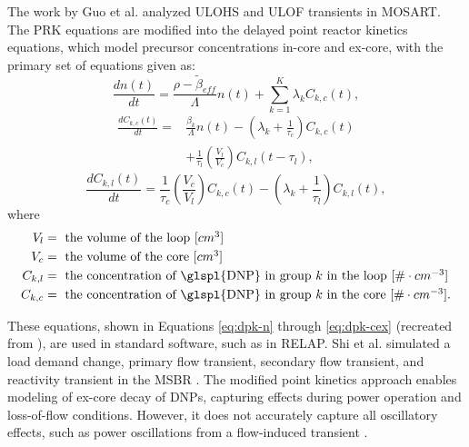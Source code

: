 The work by Guo et al. analyzed \gls{ULOHS} and \gls{ULOF} transients in \gls{MOSART}.
The \gls{PRK} equations are modified into the delayed point reactor kinetics equations, which model precursor concentrations in-core and ex-core, with the primary set of equations given as:
\begin{equation}
    \frac{dn(t)}{dt} = \frac{\rho - \tilde{\beta}_{eff}}{\Lambda} n(t) + \sum_{k=1}^{K} \lambda_k C_{k, c} (t),
    \label{eq:dpk-n}
\end{equation}
\begin{equation}
\begin{split}
    \frac{dC_{k, c}(t)}{dt} =& \frac{\beta_k}{\Lambda} n(t) - \left(\lambda_k + \frac{1}{\tau_{c}} \right) C_{k, c}(t)\\
    & + \frac{1}{\tau_{l}} \left(\frac{V_{l}}{V_{c}}\right) C_{k, l} (t - \tau_{l}),
    \label{eq:dpk-cin}
\end{split}
\end{equation}
\begin{equation}
    \frac{dC_{k, l}(t)}{dt} = \frac{1}{\tau_{c}} \left(\frac{V_{c}}{V_{l}}\right) C_{k, c} (t) - \left(\lambda_k + \frac{1}{\tau_{l}} \right) C_{k, l}(t),
    \label{eq:dpk-cex}
\end{equation}
where
\begin{align}
V_{l} &= \mbox{ the volume of the loop [$cm^3$]} \nonumber \\ 
V_{c} &= \mbox{ the volume of the core [$cm^3$]} \nonumber \\ 
C_{k,l} &= \mbox{ the concentration of \glspl{DNP} in group $k$ in the loop [$\# \cdot cm^{-3}$]} \nonumber \\ 
C_{k,c} &= \mbox{ the concentration of \glspl{DNP} in group $k$ in the core [$\# \cdot cm^{-3}$].} \nonumber
\end{align}

These equations, shown in Equations \eqref{eq:dpk-n} through \eqref{eq:dpk-cex} (recreated from \cite{guo2013simulations, shi2016development}), are used in standard software, such as in \gls{RELAP}.
Shi et al. simulated a load demand change, primary flow transient, secondary flow transient, and reactivity transient in the \gls{MSBR} \cite{shi2016development}.
The modified point kinetics approach enables modeling of ex-core decay of \glspl{DNP}, capturing effects during power operation and loss-of-flow conditions.
However, it does not accurately capture all oscillatory effects, such as power oscillations from a flow-induced transient \cite{wooten2018review}.

